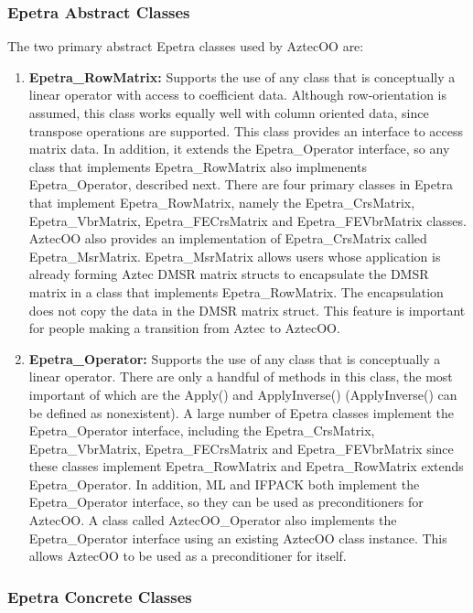 \documentclass[12pt,relax]{AztecOOUserGuide}
\newcommand{\crsmatrix}{Epetra\_CrsMatrix}
\newcommand{\vbrmatrix}{Epetra\_VbrMatrix}
\newcommand{\rowmatrix}{Epetra\_RowMatrix}
\newcommand{\operator}{Epetra\_Operator}
\newcommand{\fecrsmatrix}{Epetra\_FE\-Crs\-Matrix}
\newcommand{\fevbrmatrix}{Epetra\_FE\-Vbr\-Matrix}
\newcommand{\msrmatrix}{Epetra\_MsrMatrix}
\newcommand{\oooperator}{AztecOO\_Operator}
\begin{document}
\subsubsection{Epetra Abstract Classes}

The two primary abstract Epetra classes used by AztecOO are:
\begin{enumerate}
\item {\bf \rowmatrix{}: } Supports the use of any class that is
conceptually a linear operator with access to coefficient data.
Although row-orientation is assumed, this class works equally well
with column oriented data, since transpose operations are supported.
This class provides an interface to access matrix data.  In addition,
it extends the \operator{} interface, so any class that implements
\rowmatrix{} also implmenents \operator{}, described next.  There are
four primary classes in Epetra that implement \rowmatrix{}, namely
the \crsmatrix{}, \vbrmatrix{}, \fecrsmatrix{} and \fevbrmatrix{}
classes.  AztecOO also provides an implementation of \crsmatrix{}
called \msrmatrix{}.  \msrmatrix{} allows users whose application is
already forming Aztec DMSR matrix structs to encapsulate the DMSR
matrix in a class that implements \rowmatrix.  The encapsulation does
not copy the data in the DMSR matrix struct.  This feature is
important for people making a transition from Aztec to AztecOO.
\item {\bf \operator{}: } Supports the use of any class that is
conceptually a linear operator.  There are only a handful of methods
in this class, the most important of which are the Apply() and
ApplyInverse() (ApplyInverse() can be defined as nonexistent).
A large number of Epetra classes implement the
\operator{} interface, including the \crsmatrix{}, \vbrmatrix{},
\fecrsmatrix{} and \fevbrmatrix{} since these classes implement
\rowmatrix{} and \rowmatrix{} extends \operator{}.  In addition, ML
and IFPACK both implement the \operator{} interface, so they can be
used as preconditioners for AztecOO.  A class called \oooperator{}
also implements the \operator{} interface using an existing AztecOO
class instance.  This allows AztecOO to be used as a preconditioner
for itself.

\end{enumerate}

\subsubsection{Epetra Concrete Classes}
\end{document}
